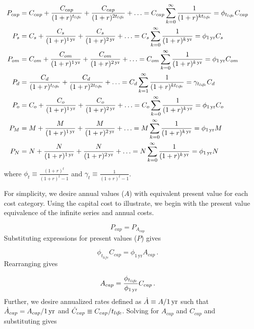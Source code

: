 \begin{align} \label{eq:present_values}
  P_{cap} &= C_{cap} + \frac{C_{cap}}{(1 + r)^{\tlife}} + \frac{C_{cap}}{(1 + r)^{2 \tlife}} + \ldots 
  = C_{cap} \sum_{k = 0}^{\infty} \frac{1}{(1 + r)^{k \tlife}} 
  = \phi_{\tlife} C_{cap} \\
%
  P_s &= C_s + \frac{C_s}{(1 + r)^{\oneyr}} + \frac{C_s}{(1 + r)^{\twoyr}} + \ldots
  = C_s \sum_{k = 0}^{\infty} \frac{1}{(1 + r)^{\kyr}}
  = \phi_{\oneyr} C_s \\
%
  P_{om} &= C_{om} + \frac{C_{om}}{(1 + r)^{\oneyr}} +  \frac{C_{om}}{(1 + r)^{\twoyr}} + \ldots
  = C_{om} \sum_{k = 0}^{\infty} \frac{1}{(1 + r)^{\kyr}}
  = \phi_{\oneyr} C_{om} \\
%
  P_d &= \frac{C_d}{(1 + r)^{\tlife}} + \frac{C_d}{(1 + r)^{2 \tlife}} + \ldots 
  = C_d \sum_{k = 1}^{\infty} \frac{1}{(1 + r)^{k \tlife}} 
  = \gamma_{\tlife} C_d \\
%
  P_o &= C_o + \frac{C_o}{(1 + r)^{\oneyr}} + \frac{C_o}{(1 + r)^{\twoyr}} + \ldots
  = C_o \sum_{k = 0}^{\infty} \frac{1}{(1 + r)^{\kyr}}
  = \phi_{\oneyr} C_o \\
%
  P_M &= M + \frac{M}{(1 + r)^{\oneyr}} + \frac{M}{(1 + r)^{\twoyr}} + \ldots
  = M \sum_{k = 0}^{\infty} \frac{1}{(1 + r)^{\kyr}}
  = \phi_{\oneyr} M \\
%
  P_N &= N + \frac{N}{(1 + r)^{\oneyr}} + \frac{N}{(1 + r)^{\twoyr}} + \ldots
  = N \sum_{k = 0}^{\infty} \frac{1}{(1 + r)^{\kyr}}
  = \phi_{\oneyr} N
\end{align}
%
where $\phi_t \equiv \frac{(1 + r)^t}{(1 + r)^t - 1}$
and $\gamma_t \equiv \frac{1}{(1 + r)^t - 1}$.

For simplicity, we desire annual values ($A$)
with equivalent present value for each cost category. 
Using the capital cost to illustrate, 
we begin with the present value equivalence of the infinite series and 
annual costs.

\begin{equation}
  P_{cap} = P_{A_{cap}}
\end{equation}
%
Substituting expressions for present values ($P$) gives

\begin{equation}
  \phi_{t_{life}} C_{cap} = \phi_{1\,\mathrm{yr}} A_{cap} \, .
\end{equation}
%
Rearranging gives

\begin{equation}
  A_{cap} = \frac{\phi_{t_{li\!f\!e}}}{\phi_{1\,\mathrm{yr}}} C_{cap} \, .
\end{equation}
%
Further, we desire annualized rates defined as
$\dot{A} \equiv A/1\,\mathrm{yr}$ such that
$\dot{A}_{cap} = A_{cap}/1\,\mathrm{yr}$
and 
$\dot{C}_{cap} \equiv C_{cap}/t_{li\!f\!e}$.
Solving for $A_{cap}$ and $C_{cap}$ and substituting gives

